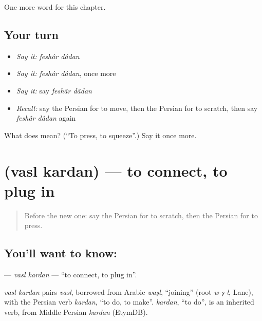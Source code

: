 \begin{grammarlens}[title={What you've built}]
One more word for this chapter.
\end{grammarlens}

\subsection*{Your turn}
\begin{itemize}
\raggedright
  \item \emph{Say it:} \emph{feshâr dâdan}
  \item \emph{Say it:} \emph{feshâr dâdan}, once more
  \item \emph{Say it:} say \emph{feshâr dâdan}
  \item \emph{Recall:} say the Persian for to move, then the Persian for to scratch, then say \emph{feshâr dâdan} again
\end{itemize}

\begin{tcolorbox}[breakable,colback=teal!4,colframe=teal!35!black,title={Before you move on}]
What does   mean? (\textquotedblleft{}To press, to squeeze\textquotedblright{}.) Say it once more.
\end{tcolorbox}
\section[\texorpdfstring{\fa{وصل} \fa{کردن} (vasl kardan)}{وصل کردن (vasl kardan)}]{  (vasl kardan) — to connect, to plug in}

\label{lesson:FA-C224-vasl-kardan}



\begin{quote}
Before the new one: say the Persian for to scratch, then the Persian for to press.
\end{quote}

\subsection*{You'll want to know:  }
\textbf{ } — \emph{vasl kardan} — \textquotedblleft{}to connect, to plug in\textquotedblright{}.

\begin{cousinweb}
\emph{vasl kardan} pairs \emph{vasl}, borrowed from Arabic \emph{waṣl}, \textquotedblleft{}joining\textquotedblright{} (root \emph{w-ṣ-l}, Lane), with the Persian verb \emph{kardan}, \textquotedblleft{}to do, to make\textquotedblright{}. \emph{kardan}, \textquotedblleft{}to do\textquotedblright{}, is an inherited verb, from Middle Persian \emph{kardan} (EtymDB).
\end{cousinweb}

